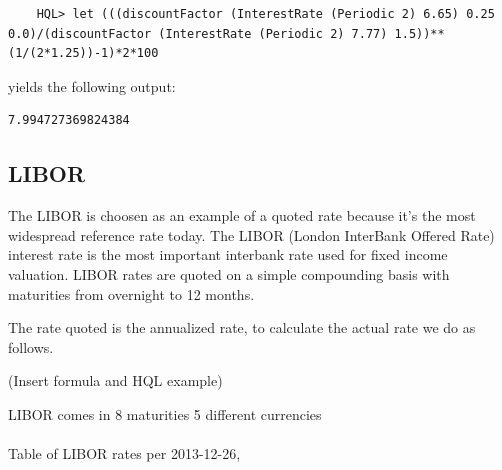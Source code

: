 \documentclass[11pt,a4paper]{article}
\numberwithin{equation}{section}
\begin{document}
	\FrameSep
	\begin{lstlisting}
	HQL> let (((discountFactor (InterestRate (Periodic 2) 6.65) 0.25 0.0)/(discountFactor (InterestRate (Periodic 2) 7.77) 1.5))**(1/(2*1.25))-1)*2*100
	\end{lstlisting}
	yields the following output:
	\FrameSep
	\begin{lstlisting}[style=Output]
	7.994727369824384
	\end{lstlisting}

	\subsection{LIBOR}
        The LIBOR is choosen as an example of a quoted rate because it's the most widespread reference rate today.
        The LIBOR (London InterBank Offered Rate) interest rate is the most important interbank rate
	used for fixed income valuation. LIBOR rates are quoted on a simple compounding basis with maturities
	from overnight to 12 months.

	The rate quoted is the annualized rate, to calculate the actual rate we do as follows.

        (Insert formula and HQL example)

	\begin{minipage}{\linewidth}
	\label{fig:comp01}
	\end{minipage}


	LIBOR comes in 8 maturities
	5 different currencies
	\\
	\\
	Table of LIBOR rates per 2013-12-26,

\end{document}
